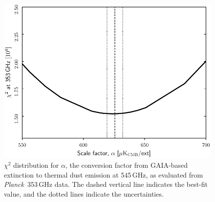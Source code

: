 \documentclass{aa}
\def\Planck{\textit{Planck}}
\begin{document}
\begin{figure}
  \centering
  \includegraphics[width=\columnwidth]{figures/chisq_353_alpha.pdf}
  \caption{$\chi^2$ distribution for $\alpha$, the conversion factor from GAIA-based extinction to thermal dust emission at 545\,GHz, as evaluated from \Planck\ 353\,GHz data. The dashed vertical line indicates the best-fit value, and the dotted lines indicate the uncertainties. }
  \label{fig:chisq_353_alpha}
\end{figure}
\end{document}
